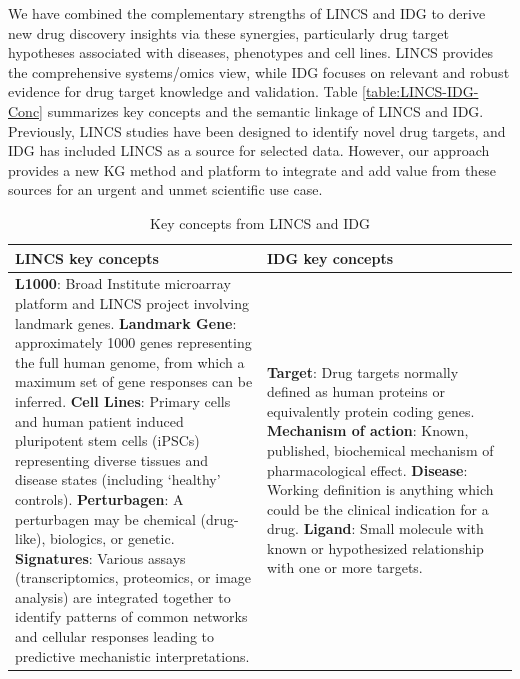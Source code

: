 We have combined the complementary strengths of LINCS and IDG to derive new drug discovery insights via these synergies, particularly drug target hypotheses associated with diseases, phenotypes and cell lines. LINCS provides the comprehensive systems/omics view, while IDG focuses on relevant and robust evidence for drug target knowledge and validation. Table \ref{table:LINCS-IDG-Conc} summarizes key concepts and the semantic linkage of LINCS and IDG. Previously, LINCS studies have been designed to identify novel drug targets\cite{Chen2017-zj}, and IDG has included LINCS as a source for selected data\cite{Ursu2018-sc}. However, our approach provides a new KG method and platform to integrate and add value from these sources for an urgent and unmet scientific use case.

\begin{table}
\caption{Key concepts from LINCS and IDG}
\begin{center}
\begin{tabular}{|p{0.5\linewidth}|p{0.5\linewidth}|}
\hline
\textbf{LINCS key concepts} & \textbf{IDG key concepts} \\
\hline
\textbf{L1000}: Broad Institute microarray platform and LINCS project involving landmark genes. \newline
\textbf{Landmark Gene}: approximately 1000 genes representing the full human genome, from which a maximum set of gene responses can be inferred.\newline
\textbf{Cell Lines}: Primary cells and human patient induced pluripotent stem cells (iPSCs) representing diverse tissues and disease states (including ‘healthy’ controls).\newline
\textbf{Perturbagen}: A perturbagen may be chemical (drug-like), biologics, or genetic.\newline
\textbf{Signatures}: Various assays (transcriptomics, proteomics, or image analysis) are integrated together to identify patterns of common networks and cellular responses leading to predictive mechanistic interpretations.
& 
\textbf{Target}: Drug targets normally defined as human proteins or equivalently protein coding genes.\newline
\textbf{Mechanism of action}: Known, published, biochemical mechanism of pharmacological effect.\newline
\textbf{Disease}: Working definition is anything which could be the clinical indication for a drug.\newline
\textbf{Ligand}: Small molecule with known or hypothesized relationship with one or more targets.\newline

\end{tabular}
\end{center}
\end{table}
